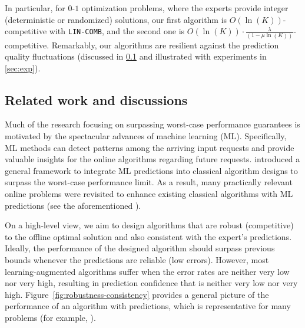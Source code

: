 In particular, for $0$-$1$ optimization problems, where the experts provide integer (deterministic or randomized) solutions, our first algorithm is $O(\ln(K))$-competitive with \texttt{LIN-COMB}, and the second one is $O(\ln(K)) \cdot \frac{\lambda}{(1-\mu\ln(K))}$-competitive.
Remarkably, our algorithms are resilient against the prediction quality fluctuations (discussed in \cref{subsec:related-works} and illustrated with experiments in \cref{sec:exp}).


\subsection{Related work and discussions} \label{subsec:related-works}

Much of the research focusing on surpassing worst-case performance guarantees is motivated by the spectacular advances of machine learning (ML). Specifically, ML methods can detect patterns among the arriving input requests and provide valuable insights for the online algorithms regarding future requests. \cite{LykourisVassilvtiskii18:Competitive-caching} introduced a general framework to integrate ML predictions into classical algorithm designs to surpass the worst-case performance limit.
As a result, many practically relevant online problems were revisited to enhance existing classical algorithms with ML predictions (see the aforementioned \cite{LattanziLavastida20:Online-scheduling,Mitzenmacher20:Scheduling-with,LykourisVassilvtiskii18:Competitive-caching,Rohatgi20:Near-optimal-bounds,AntoniadisCoester20:Online-metric,GollapudiPanigrahi19:Online-algorithms,KumarPurohit18:Improving-online,AngelopoulosDurr20:Online-Computation,HsuIndyk19:Learning-Based-Frequency,KraskaBeutel18:The-case-for-learned,Mitzenmacher18:A-model-for-learned,AntoniosEtAll23:mixing-predictions-metric-algorithms}).

On a high-level view, we aim to design algorithms that are robust (competitive) to the offline optimal solution and also consistent with the expert's predictions. Ideally, the performance of the designed algorithm should surpass previous bounds whenever the predictions are reliable (low errors).
However, most learning-augmented algorithms suffer when the error rates are neither very low nor very high, resulting in prediction confidence that is neither very low nor very high.
Figure~\ref{fig:robustness-consistency} provides a general picture of the performance of an algorithm with predictions, which is representative for many problems (for example, \cite{BamasMaggoriSvensson20:primal-dual-method,KeviNguyen23:Primal-Dual-Algorithms}).

